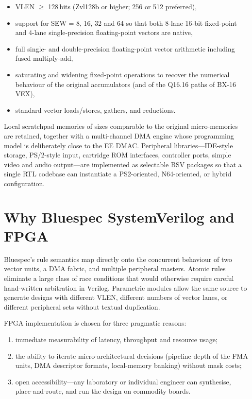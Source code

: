 \documentclass[11pt,a4paper]{article}
\begin{document}
\begin{itemize}[leftmargin=1.5em]
  \item VLEN $\ge$ 128\,bits (Zvl128b or higher; 256 or 512 preferred),
  \item support for SEW = 8, 16, 32 and 64 so that both 8-lane 16-bit fixed-point and 4-lane single-precision floating-point vectors are native,
  \item full single- and double-precision floating-point vector arithmetic including fused multiply-add,
  \item saturating and widening fixed-point operations to recover the numerical behaviour of the original accumulators (and of the Q16.16 paths of BX-16 VEX),
  \item standard vector loads/stores, gathers, and reductions.
\end{itemize}

Local scratchpad memories of sizes comparable to the original micro-memories are retained, together with a multi-channel DMA engine whose programming model is deliberately close to the EE DMAC. Peripheral libraries---IDE-style storage, PS/2-style input, cartridge ROM interfaces, controller ports, simple video and audio output---are implemented as selectable BSV packages so that a single RTL codebase can instantiate a PS2-oriented, N64-oriented, or hybrid configuration.

\section{Why Bluespec SystemVerilog and FPGA}

Bluespec's rule semantics map directly onto the concurrent behaviour of two vector units, a DMA fabric, and multiple peripheral masters. Atomic rules eliminate a large class of race conditions that would otherwise require careful hand-written arbitration in Verilog. Parametric modules allow the same source to generate designs with different VLEN, different numbers of vector lanes, or different peripheral sets without textual duplication.

FPGA implementation is chosen for three pragmatic reasons:
\begin{enumerate}[leftmargin=1.5em]
  \item immediate measurability of latency, throughput and resource usage;
  \item the ability to iterate micro-architectural decisions (pipeline depth of the FMA units, DMA descriptor formats, local-memory banking) without mask costs;
  \item open accessibility---any laboratory or individual engineer can synthesise, place-and-route, and run the design on commodity boards.
\end{enumerate}
\end{document}
